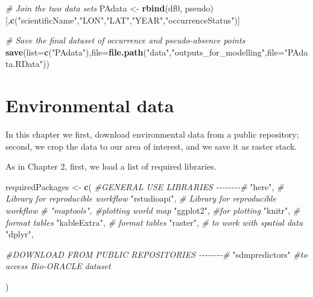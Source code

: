 \documentclass[
]{book}
\newenvironment{Shaded}{\begin{snugshade}}{\end{snugshade}}
\newcommand{\AttributeTok}[1]{\textcolor[rgb]{0.13,0.29,0.53}{#1}}
\newcommand{\CommentTok}[1]{\textcolor[rgb]{0.56,0.35,0.01}{\textit{#1}}}
\newcommand{\FunctionTok}[1]{\textcolor[rgb]{0.13,0.29,0.53}{\textbf{#1}}}
\newcommand{\NormalTok}[1]{#1}
\newcommand{\OtherTok}[1]{\textcolor[rgb]{0.56,0.35,0.01}{#1}}
\newcommand{\StringTok}[1]{\textcolor[rgb]{0.31,0.60,0.02}{#1}}
\begin{document}
\begin{Shaded}
\begin{Highlighting}[]
\CommentTok{\# Join the two data sets }
\NormalTok{PAdata }\OtherTok{\textless{}{-}} \FunctionTok{rbind}\NormalTok{(df0, pseudo)[,}\FunctionTok{c}\NormalTok{(}\StringTok{"scientificName"}\NormalTok{,}\StringTok{"LON"}\NormalTok{,}\StringTok{"LAT"}\NormalTok{,}\StringTok{"YEAR"}\NormalTok{,}\StringTok{"occurrenceStatus"}\NormalTok{)]}

\CommentTok{\# Save the final dataset of occurrence and pseudo{-}absence points}
\FunctionTok{save}\NormalTok{(}\AttributeTok{list=}\FunctionTok{c}\NormalTok{(}\StringTok{"PAdata"}\NormalTok{),}\AttributeTok{file=}\FunctionTok{file.path}\NormalTok{(}\StringTok{"data"}\NormalTok{,}\StringTok{"outputs\_for\_modelling"}\NormalTok{,}\AttributeTok{file=}\StringTok{"PAdata.RData"}\NormalTok{))}
\end{Highlighting}
\end{Shaded}

\chapter{Environmental data}\label{environmental-data}

In this chapter we first, download environmental data from a public repository; second, we crop the data to our area of interest, and we save it as raster stack.

As in Chapter 2, first, we load a list of required libraries.

\begin{Shaded}
\begin{Highlighting}[]
\NormalTok{requiredPackages }\OtherTok{\textless{}{-}} \FunctionTok{c}\NormalTok{(}
  \CommentTok{\#GENERAL USE LIBRARIES {-}{-}{-}{-}{-}{-}{-}{-}\#}
  \StringTok{"here"}\NormalTok{, }\CommentTok{\# Library for reproducible workflow}
  \StringTok{"rstudioapi"}\NormalTok{,  }\CommentTok{\# Library for reproducible workflow}
  \CommentTok{\# "maptools", \#plotting world map}
  \StringTok{"ggplot2"}\NormalTok{, }\CommentTok{\#for plotting}
  \StringTok{"knitr"}\NormalTok{,  }\CommentTok{\# format tables}
  \StringTok{"kableExtra"}\NormalTok{, }\CommentTok{\# format tables}
  \StringTok{"raster"}\NormalTok{, }\CommentTok{\# to work with spatial data}
  \StringTok{"dplyr"}\NormalTok{,}
  
  \CommentTok{\#DOWNLOAD FROM PUBLIC REPOSITORIES {-}{-}{-}{-}{-}{-}{-}{-}\#}
  \StringTok{"sdmpredictors"} \CommentTok{\#to access Bio{-}ORACLE dataset}
  
\NormalTok{    )}
\end{Highlighting}
\end{Shaded}
\end{document}
